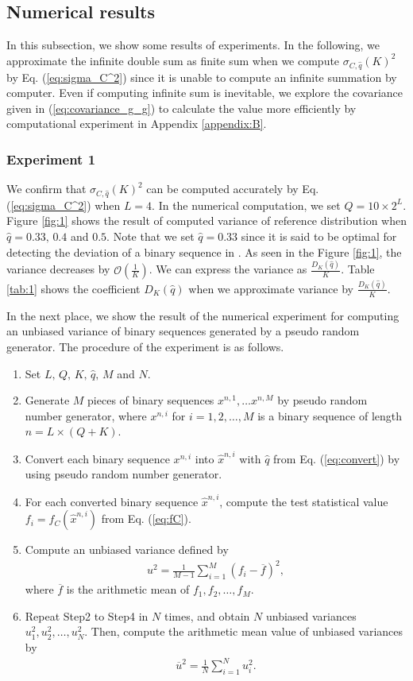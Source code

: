 \documentclass[dvipdfmx,english]{ampmt} %
\begin{document}
\subsection{Numerical results}\label{subsec:numerical_exp_L4}
In this subsection, we show some results of experiments. 
In the following, we approximate the infinite double sum as finite sum when we compute $\sigma_{C,\hat{q}} (K)^2$ by Eq. (\ref{eq:sigma_C^2}) since it is unable to compute an infinite summation by computer. Even if computing infinite sum is inevitable, we explore the covariance given in (\ref{eq:covariance_g_g}) to calculate the value more efficiently by computational experiment in Appendix \ref{appendix:B}.
%
\subsubsection{Experiment 1}
%
We confirm that $\sigma_{C,\hat{q}} (K)^2$ can be computed accurately by Eq. (\ref{eq:sigma_C^2}) when $L=4$. In the numerical computation, we set $Q=10 \times 2^L$.
Figure \ref{fig:1} shows the result of computed variance of reference distribution when $\hat{q}=0.33,\, 0.4$ and $0.5$. Note that we set $\hat{q}=0.33$ since it is said to be optimal for detecting the deviation of a binary sequence in \cite{yamamoto2016highly}. As seen in the Figure \ref{fig:1}, the variance decreases by $\mathcal{O}(\frac{1}{K})$. We can express the variance as $\frac{D_K(\hat{q})}{K}$. Table \ref{tab:1} shows the coefficient $D_K(\hat{q})$ when we approximate variance by $\frac{D_K(\hat{q})}{K}$. 
\par
In the next place, we show the result of the numerical experiment for computing an unbiased variance of binary sequences generated by a pseudo random generator. The procedure of the experiment is as follows.
\begin{enumerate}[Step1:]
  \item Set $L,\,Q,\,K,\,\hat{q},\,M$ and $N$.
  \item Generate $M$ pieces of binary sequences $x^{n,1},\dots x^{n,M}$ by pseudo random number generator, where $x^{n,i}$ for $i=1,2,\dots,M$ is a binary sequence of length $n=L\times(Q+K)$.
  \item Convert each binary sequence $x^{n,i}$ into $\hat{x}^{n,i}$ with $\hat{q}$ from Eq. (\ref{eq:convert}) by using pseudo random number generator.
  \item For each converted binary sequence $\hat{x}^{n,i}$, compute the test statistical value $f_i=f_C(\hat{x}^{n,i})$ from Eq. (\ref{eq:fC}).
  \item Compute an unbiased variance defined by
  \begin{align}
    u^2 = \frac{1}{M-1}\sum_{i=1}^{M}(f_i - \overline{f})^2,
  \end{align}
  where $\overline{f}$ is the arithmetic mean of $f_1,f_2,\dots,f_M$.
  \item Repeat Step2 to Step4 in $N$ times, and obtain $N$ unbiased variances $u_1^2,u_2^2,\dots,u_N^2$. Then, compute the arithmetic mean value of unbiased variances by
  \begin{align}
    \overline{u}^2 = \frac{1}{N} \sum_{i=1}^{N} u_i^2.
  \end{align}
\end{enumerate}
\end{document}
